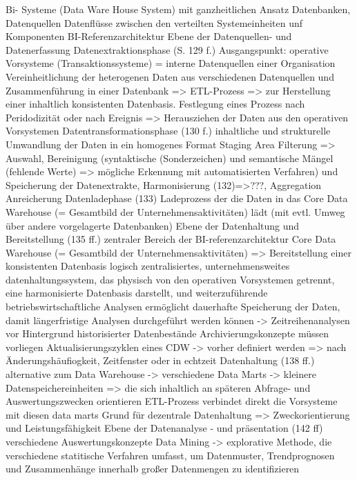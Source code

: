 Bi- Systeme (Data Ware House System) mit ganzheitlichen Ansatz
    Datenbanken, Datenquellen
    Datenflüsse zwischen den verteilten Systemeinheiten unf Komponenten
BI-Referenzarchitektur
Ebene der Datenquellen- und Datenerfassung
    Datenextraktionsphase (S. 129 f.)
        Ausgangspunkt: operative Vorsysteme (Transaktionssysteme) = interne Datenquellen einer Organisation
        Vereinheitlichung der heterogenen Daten aus verschiedenen Datenquellen und Zusammenführung in einer Datenbank => ETL-Prozess
        => zur Herstellung einer inhaltlich konsistenten Datenbasis.
        Festlegung eines Prozess nach Peridodizität oder nach Ereignis => Herausziehen der Daten aus den operativen Vorsystemen       
    Datentransformationsphase (130 f.)
        inhaltliche und strukturelle Umwandlung der Daten in ein homogenes Format
        Staging  Area
            Filterung => Auswahl, Bereinigung (syntaktische (Sonderzeichen) und semantische Mängel (fehlende Werte) => mögliche Erkennung mit automatisierten Verfahren) und Speicherung der Datenextrakte, 
        Harmonisierung (132)=>???, 
        Aggregation
        Anreicherung
    Datenladephase (133)
        Ladeprozess der die Daten in das Core Data Warehouse (= Gesamtbild der Unternehmensaktivitäten) lädt (mit evtl. Umweg über andere vorgelagerte Datenbanken)
Ebene der Datenhaltung und Bereitstellung (135 ff.)
    zentraler Bereich der BI-referenzarchitektur
    Core Data Warehouse (= Gesamtbild der Unternehmensaktivitäten) => Bereitstellung einer konsistenten Datenbasis
    logisch zentralisiertes, unternehmensweites datenhaltungssystem, das physisch von den operativen Vorsystemen getrennt, eine harmonisierte Datenbasis darstellt,
    und weiterzuführende betriebswirtschaftliche Analysen ermöglicht
    dauerhafte Speicherung der Daten, damit längerfristige Analysen durchgeführt werden können -> Zeitreihenanalysen vor Hintergrund historisierter Datenbestände
    Archivierungskonzepte müssen vorliegen
    Aktualisierungszyklen eines CDW -> vorher definiert werden  => nach Änderungshäufiogkeit, Zeitfenster oder in echtzeit
    Datenhaltung (138 ff.)
    alternative zum Data Warehouse -> verschiedene Data Marts -> kleinere Datenspeichereinheiten => die sich inhaltlich an späteren Abfrage- und Auswertungszwecken orientieren
    ETL-Prozess verbindet direkt die Vorsysteme mit diesen data marts
    Grund für dezentrale Datenhaltung => Zweckorientierung und Leistungsfähigkeit
Ebene der Datenanalyse - und präsentation (142 ff)
    verschiedene Auswertungskonzepte
        Data Mining -> explorative Methode, die verschiedene statitische Verfahren umfasst, um Datenmuster, Trendprognosen und Zusammenhänge innerhalb großer Datenmengen zu identifizieren
